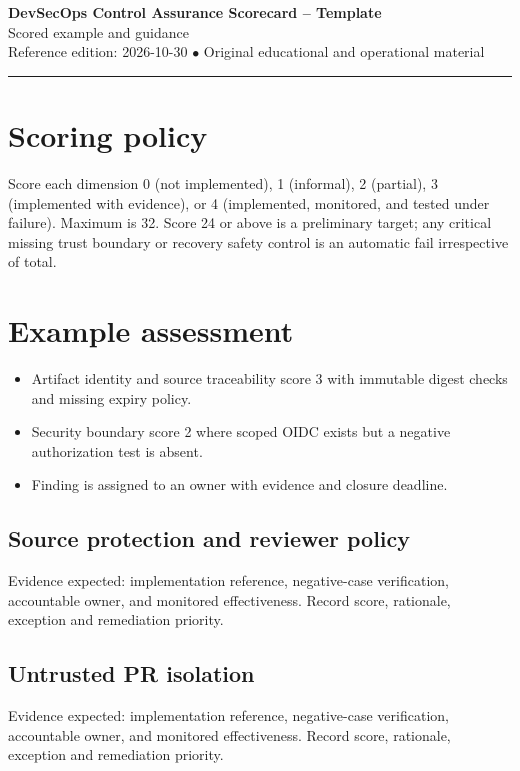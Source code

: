 \documentclass[10pt,letterpaper]{article}
\begin{document}
\begin{center}
{\LARGE\bfseries\color{cdblue}DevSecOps Control Assurance Scorecard -- Template}\\[7pt]
{\large Scored example and guidance}\\[6pt]
{\small Reference edition: 2026-10-30 $\bullet$ Original educational and operational material}
\end{center}
\noindent\color{cdblue}\rule{\linewidth}{1.2pt}\color{black}
\vspace{0.4em}
\section{Scoring policy}
Score each dimension 0 (not implemented), 1 (informal), 2 (partial), 3 (implemented with evidence), or 4 (implemented, monitored, and tested under failure). Maximum is 32. Score 24 or above is a preliminary target; any critical missing trust boundary or recovery safety control is an automatic fail irrespective of total.


\section{Example assessment}
\begin{itemize}
\item Artifact identity and source traceability score 3 with immutable digest checks and missing expiry policy.
\item Security boundary score 2 where scoped OIDC exists but a negative authorization test is absent.
\item Finding is assigned to an owner with evidence and closure deadline.
\end{itemize}

\subsection{Source protection and reviewer policy}
Evidence expected: implementation reference, negative-case verification, accountable owner, and monitored effectiveness. Record score, rationale, exception and remediation priority.


\subsection{Untrusted PR isolation}
Evidence expected: implementation reference, negative-case verification, accountable owner, and monitored effectiveness. Record score, rationale, exception and remediation priority.
\end{document}
